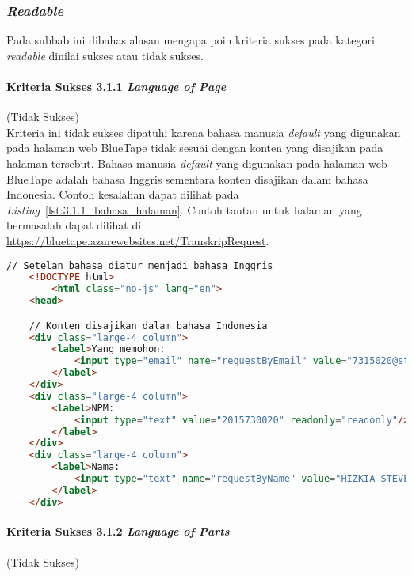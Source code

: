 \subsubsection{\textit{Readable}}
\label{subsubsec:kepatuhan_bluetape_readable}
Pada subbab ini dibahas alasan mengapa poin kriteria sukses pada kategori \textit{readable} dinilai sukses atau tidak sukses.

\paragraph{Kriteria Sukses 3.1.1 \textit{Language of Page}}
\label{par:kepatuhan_bluetape_kriteria_sukses_3.1.1}
(Tidak Sukses)\\

Kriteria ini tidak sukses dipatuhi karena bahasa manusia \textit{default} yang digunakan pada halaman web BlueTape tidak sesuai dengan konten yang disajikan pada halaman tersebut. Bahasa manusia \textit{default} yang digunakan pada halaman web BlueTape adalah bahasa Inggris sementara konten disajikan dalam bahasa Indonesia. Contoh kesalahan dapat dilihat pada \mbox{\textit{Listing} \ref{lst:3.1.1_bahasa_halaman}}. Contoh tautan untuk halaman yang bermasalah dapat dilihat di \url{https://bluetape.azurewebsites.net/TranskripRequest}.

\begin{lstlisting}[frame=single, label={lst:3.1.1_bahasa_halaman}, language=HTML, caption=Pelanggaran Kriteria Sukses 3.1.1 pada Halaman Cetak Transkrip]
    // Setelan bahasa diatur menjadi bahasa Inggris
    <!DOCTYPE html>
        <html class="no-js" lang="en">
    <head>

    // Konten disajikan dalam bahasa Indonesia
    <div class="large-4 column">
        <label>Yang memohon:
            <input type="email" name="requestByEmail" value="7315020@student.unpar.ac.id" readonly="readonly"/>
        </label>
    </div>
    <div class="large-4 column">
        <label>NPM:
            <input type="text" value="2015730020" readonly="readonly"/>
        </label>
    </div>
    <div class="large-4 column">
        <label>Nama:
            <input type="text" name="requestByName" value="HIZKIA STEVEN" readonly="readonly"/>
        </label>
    </div>
\end{lstlisting}

\paragraph{Kriteria Sukses 3.1.2 \textit{Language of Parts}}
\label{par:kepatuhan_bluetape_kriteria_sukses_3.1.2}
(Tidak Sukses)\\

